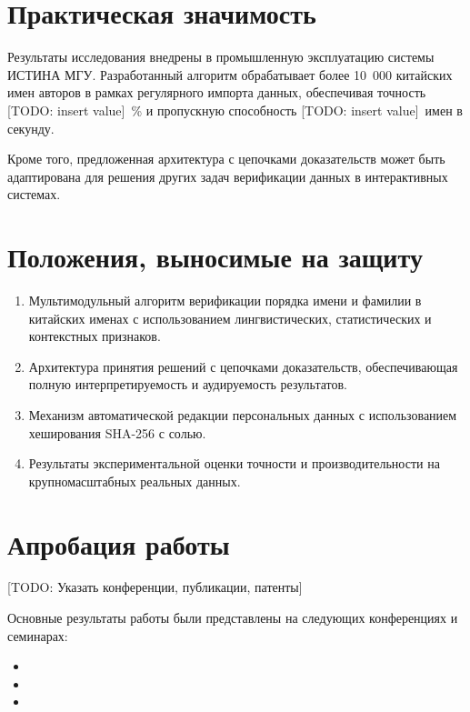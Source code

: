 \section{Практическая значимость}
\label{sec:intro:significance}

Результаты исследования внедрены в промышленную эксплуатацию системы ИСТИНА МГУ. Разработанный алгоритм обрабатывает более 10~000 китайских имен авторов в рамках регулярного импорта данных, обеспечивая точность [TODO: insert value]~\% и пропускную способность [TODO: insert value]~имен в секунду.

Кроме того, предложенная архитектура с цепочками доказательств может быть адаптирована для решения других задач верификации данных в интерактивных системах.

\section{Положения, выносимые на защиту}
\label{sec:intro:defense}

\begin{enumerate}
    \item Мультимодульный алгоритм верификации порядка имени и фамилии в китайских именах с использованием лингвистических, статистических и контекстных признаков.

    \item Архитектура принятия решений с цепочками доказательств, обеспечивающая полную интерпретируемость и аудируемость результатов.

    \item Механизм автоматической редакции персональных данных с использованием хеширования SHA-256 с солью.

    \item Результаты экспериментальной оценки точности и производительности на крупномасштабных реальных данных.
\end{enumerate}

\section{Апробация работы}
\label{sec:intro:approbation}

[TODO: Указать конференции, публикации, патенты]

Основные результаты работы были представлены на следующих конференциях и семинарах:

\begin{itemize}
    \item [TODO: Conference 1]
    \item [TODO: Conference 2]
    \item [TODO: Seminar/Workshop]
\end{itemize}

